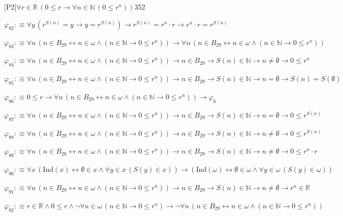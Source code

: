 \begin{fullproof}{[P2]}{$\forall r \in \mathbb{R}\,(0 \leq r \to \forall n \in \mathbb{N}\,(0 \leq {{r}^{n}}))$}{352}
\begin{abbrevlist}
\item $\varphi_{82} :\equiv \forall y\,({{r}^{S(n)}} = y \to y = {{r}^{S(n)}}) \to {{r}^{S(n)}} = {{r}^{n}} \cdot r \to {{r}^{n}} \cdot r = {{r}^{S(n)}}$
\item $\varphi_{83} :\equiv \forall n\,(n \in B_{29} \leftrightarrow n \in \omega \land (n \in \mathbb{N} \to 0 \leq {{r}^{n}})) \to \forall n\,(n \in B_{29} \leftrightarrow n \in \omega \land (n \in \mathbb{N} \to 0 \leq {{r}^{n}}))$
\item $\varphi_{84} :\equiv \forall n\,(n \in B_{29} \leftrightarrow n \in \omega \land (n \in \mathbb{N} \to 0 \leq {{r}^{n}})) \to n \in B_{29} \to S(n) \in \mathbb{N} \to n \neq \emptyset \to 0 \leq {{r}^{n}}$
\item $\varphi_{85} :\equiv \forall n\,(n \in B_{29} \leftrightarrow n \in \omega \land (n \in \mathbb{N} \to 0 \leq {{r}^{n}})) \to n \in B_{29} \to S(n) \in \mathbb{N} \to n = \emptyset \to S(n) = S(\emptyset)$
\item $\varphi_{86} :\equiv 0 \leq r \to \forall n\,(n \in B_{29} \leftrightarrow n \in \omega \land (n \in \mathbb{N} \to 0 \leq {{r}^{n}})) \to \varphi_{6}$
\item $\varphi_{87} :\equiv \forall n\,(n \in B_{29} \leftrightarrow n \in \omega \land (n \in \mathbb{N} \to 0 \leq {{r}^{n}})) \to n \in B_{29} \to S(n) \in \mathbb{N} \to n = \emptyset \to 0 \leq {{r}^{S(n)}}$
\item $\varphi_{88} :\equiv \forall n\,(n \in B_{29} \leftrightarrow n \in \omega \land (n \in \mathbb{N} \to 0 \leq {{r}^{n}})) \to n \in B_{29} \to S(n) \in \mathbb{N} \to n \neq \emptyset \to 0 \leq {{r}^{S(n)}}$
\item $\varphi_{89} :\equiv \forall n\,(n \in B_{29} \leftrightarrow n \in \omega \land (n \in \mathbb{N} \to 0 \leq {{r}^{n}})) \to n \in B_{29} \to S(n) \in \mathbb{N} \to n \neq \emptyset \to 0 \leq {{r}^{n}} \cdot r$
\item $\varphi_{90} :\equiv \forall x\,(\mathrm{Ind}(x) \leftrightarrow \emptyset \in x \land \forall y \in x\,(S(y) \in x)) \to (\mathrm{Ind}(\omega) \leftrightarrow \emptyset \in \omega \land \forall y \in \omega\,(S(y) \in \omega))$
\item $\varphi_{91} :\equiv \forall n\,(n \in B_{29} \leftrightarrow n \in \omega \land (n \in \mathbb{N} \to 0 \leq {{r}^{n}})) \to n \in B_{29} \to S(n) \in \mathbb{N} \to n \neq \emptyset \to {{r}^{n}} \in \mathbb{R}$
\item $\varphi_{92} :\equiv r \in \mathbb{R} \land 0 \leq r \land \neg \forall n \in \omega\,(n \in \mathbb{N} \to 0 \leq {{r}^{n}}) \to \neg \forall n\,(n \in B_{29} \leftrightarrow n \in \omega \land (n \in \mathbb{N} \to 0 \leq {{r}^{n}}))$

\end{abbrevlist}
\end{fullproof}
